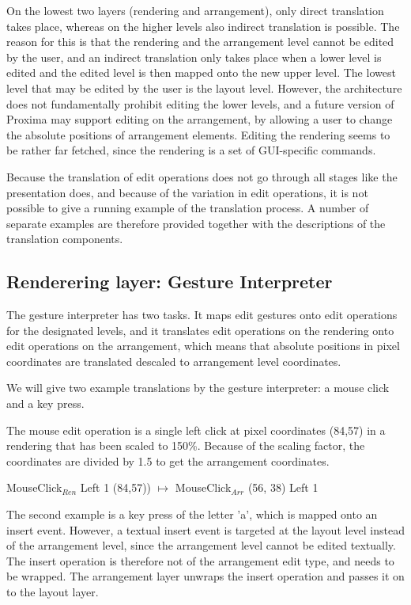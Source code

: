 On the lowest two layers (rendering and arrangement), only direct translation takes place, whereas on the higher levels also indirect translation is possible. The reason for this is that the rendering and the arrangement level cannot be edited by the user, and an indirect translation only takes place when a lower level is edited and the edited level is then mapped onto the new upper level. The lowest level that may be edited by the user is the layout level. However, the architecture does not fundamentally prohibit editing the lower levels, and a future version of Proxima may support editing on the arrangement, by allowing a user to change the absolute positions of arrangement elements. Editing the rendering seems to be rather far fetched, since the rendering is a set of GUI-specific commands.

Because the translation of edit operations does not go through all stages like the presentation does, and because of the variation in edit operations, it is not possible to give a running example of the translation process. A number of separate examples are therefore provided together with the descriptions of the translation components.

\subsection{Renderering layer: Gesture Interpreter} \label{sect:gestureInterpreter}

The gesture interpreter has two tasks. It maps edit gestures onto edit operations for the designated levels, and it translates edit operations on the rendering onto edit operations on the arrangement, which means that absolute positions in pixel coordinates are translated descaled to arrangement level coordinates. 

We will give two example translations by the gesture interpreter: a mouse click and a key press. 

The mouse edit operation is a single left click at pixel coordinates (84,57) in a rendering that has been scaled to 150\%.
Because of the scaling factor, the coordinates are divided by 1.5 to get the arrangement coordinates.

\ttfamily
MouseClick$_{Ren}$ Left 1 (84,57)) $\mapsto$ MouseClick$_{Arr}$ (56, 38) Left 1\\
\rmfamily

The second example is a key press of the letter 'a', which is mapped onto an insert event. However, a textual insert event is targeted at the layout level instead of the arrangement level, since the arrangement level cannot be edited textually. The insert operation is therefore not of the arrangement edit type, and needs to be wrapped. The arrangement layer unwraps the insert operation and passes it on to the layout layer.

